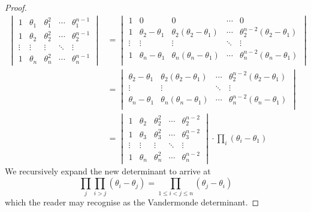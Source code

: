 \begin{proof}
  \begin{align*}
    \begin{vmatrix}
      1      & \theta_1 & \theta_1^2 & \cdots & \theta_1^{n-1}\\
      1      & \theta_2 & \theta_2^2 & \cdots & \theta_2^{n-1}\\
      \vdots & \vdots   & \vdots     & \ddots & \vdots\\
      1      & \theta_n & \theta_n^2 & \cdots & \theta_n^{n-1}
    \end{vmatrix}
    &=
    \begin{vmatrix}
      1      & 0                   & 0          & \cdots & 0 \\
      1      & \theta_2 - \theta_1 & \theta_2(\theta_2 - \theta_1) 
             & \cdots & \theta_2^{n-2}(\theta_2 - \theta_1)\\
      \vdots & \vdots   & \vdots     & \ddots & \vdots\\
      1      & \theta_n - \theta_1 & \theta_n(\theta_n - \theta_1) 
             & \cdots & \theta_n^{n-2}(\theta_n - \theta_1)\\
    \end{vmatrix}\\
    &= 
    \begin{vmatrix}
      \theta_2 - \theta_1 & \theta_2(\theta_2 - \theta_1) &
      \cdots & \theta_2^{n-2}(\theta_2 - \theta_1)\\
      \vdots   & \vdots     & \ddots & \vdots\\
      \theta_n - \theta_1 & \theta_n(\theta_n - \theta_1) &
      \cdots & \theta_n^{n-2}(\theta_n - \theta_1)\\
    \end{vmatrix}\\
    &=
    \begin{vmatrix}
      1      & \theta_2 & \theta_2^2 & \cdots & \theta_2^{n-2}\\
      1      & \theta_3 & \theta_3^2 & \cdots & \theta_3^{n-2}\\
      \vdots & \vdots   & \vdots     & \ddots & \vdots\\
      1      & \theta_n & \theta_n^2 & \cdots & \theta_n^{n-2}
    \end{vmatrix} \cdot \prod_i (\theta_i - \theta_1)
  \end{align*}
  We recursively expand the new determinant to arrive at \[ \prod_j \prod_{i>j}
  (\theta_i - \theta_j) = \prod_{1\le i<j\le n} (\theta_j - \theta_i)\]
  which the reader may recognise as the Vandermonde determinant.
\end{proof}

